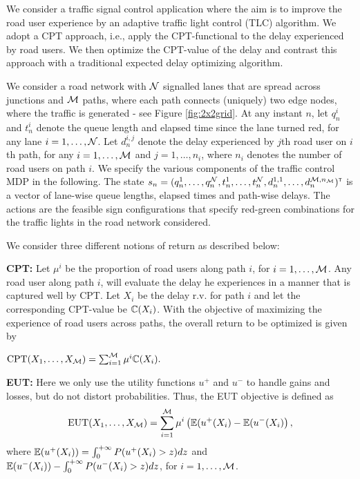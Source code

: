 We consider a traffic signal control application where the aim is to improve the road user experience by an adaptive traffic light control (TLC) algorithm.
We adopt a CPT approach, i.e., apply the CPT-functional to the delay experienced by road users. We then optimize the CPT-value of the delay  and contrast this approach with a traditional expected delay optimizing algorithm.

We consider a road network with $\mathcal{N}$ signalled lanes that are spread across junctions and $\mathcal{M}$ paths, where each path connects (uniquely) two edge nodes, where the traffic is generated - see Figure \ref{fig:2x2grid}.
At any instant $n$, let $q_n^i$ and $t_n^i$ denote the queue length and elapsed time since the lane turned red, for any lane $i = 1,\ldots, \mathcal{N}$. Let $d_n^{i,j}$ denote the delay experienced by $j$th road user on $i$th path, for any $i=1,\ldots,\mathcal{M}$ and $j=1,\ldots,n_i$, where $n_i$ denotes the number of road users on path $i$.
We specify the various components of the traffic control MDP in the following.
The state $s_n=(q_n^1,\ldots,q_n^{\mathcal{N}},t_n^1,\ldots,t_n^{\mathcal{N}},d_n^{1,1},\ldots,d_n^{\mathcal{M},n_{\mathcal{M}}})^\mathsf{\scriptscriptstyle T}$ is a vector of lane-wise queue lengths, elapsed times and path-wise delays.
The actions are the feasible sign configurations that specify red-green combinations for the traffic lights in the road network considered. 

We consider three different notions of return as described below:

\textbf{CPT:} Let $\mu^i$ be the proportion of road users along path $i$, for $i=1,\ldots,\mathcal{M}$. Any road user along path $i$, will evaluate the delay he experiences in a manner that is captured well by CPT. Let $X_i$ be the delay r.v. for path $i$ and let the corresponding CPT-value be $\mathbb{C}(X_i)$. With the objective of maximizing the experience of road users across paths, the overall return to be optimized is given by\\[1ex]
\centerline{$\text{CPT}(X_1,\ldots,X_{\mathcal{M}}) = \sum_{i=1}^{\mathcal{M}} \mu^i \mathbb{C}(X_i).
$}

\textbf{EUT:} Here we only use the utility functions $u^+$ and $u^-$ to handle gains and losses, but do not distort probabilities. 
Thus, the EUT objective is defined as
\begin{align}
\text{EUT}(X_1,\ldots,X_{\mathcal{M}}) = \sum_{i=1}^{\mathcal{M}} \mu^i \left(\mathbb{E}(u^+(X_i) - \mathbb{E}(u^-(X_i)\right),
\end{align}   
where $\mathbb{E}(u^+(X_i)) = \int_0^{+\infty} P(u^+(X_i)>z) dz$ and $\mathbb{E}(u^-(X_i)) - \int_0^{+\infty} P(u^-(X_i)>z) dz$, for $i=1,\ldots,\mathcal{M}$.

